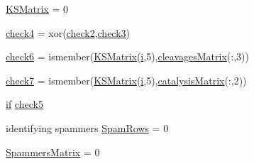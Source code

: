\begin{DoxyCompactItemize}
\item 
\hyperlink{a00030_aea43faf8d3d68de03c645edc96b0c1c0}{K\-S\-Matrix} = 0
\item 
\hyperlink{a00030_ab21c5bac10f7ac73374c002e908df5ac}{check4} = xor(\hyperlink{a00030_a98a8838a85ed24032563a44271b1525a}{check2},\hyperlink{a00030_adfd17509248a56986475a25ee50fe488}{check3})
\item 
\hyperlink{a00030_a0c9b097ea561ab0f23a69197786a243a}{check6} = ismember(\hyperlink{a00030_ab18f9eabd5f873bd17d226d786bc22df}{K\-S\-Matrix}(\hyperlink{a00113_ad3efca1ea6e3333daf30719ee0501862}{i},5),\hyperlink{a00030_a90d1d83fdcae4fb1cba5129d5820d33c}{cleavages\-Matrix}(\-:,3))
\item 
\hyperlink{a00030_a0bbe7d2ceb7b248f0826d069d5a1b735}{check7} = ismember(\hyperlink{a00030_ab18f9eabd5f873bd17d226d786bc22df}{K\-S\-Matrix}(\hyperlink{a00113_ad3efca1ea6e3333daf30719ee0501862}{i},5),\hyperlink{a00030_a244eec8903103b5bbddef461276286ce}{catalysis\-Matrix}(\-:,2))
\item 
\hyperlink{a00030_a01d55766b8058903dd360b4bda71f9f5}{if} \hyperlink{a00030_abee07c73829351d18ba356c86e3e096d}{check5}
\item 
identifying spammers \hyperlink{a00030_aa9cffa4c2d9962c67a719b05a414e478}{Spam\-Rows} = 0
\item 
\hyperlink{a00030_af1801174c9397e7fad0394203f120c31}{Spammers\-Matrix} = 0
\end{DoxyCompactItemize}


